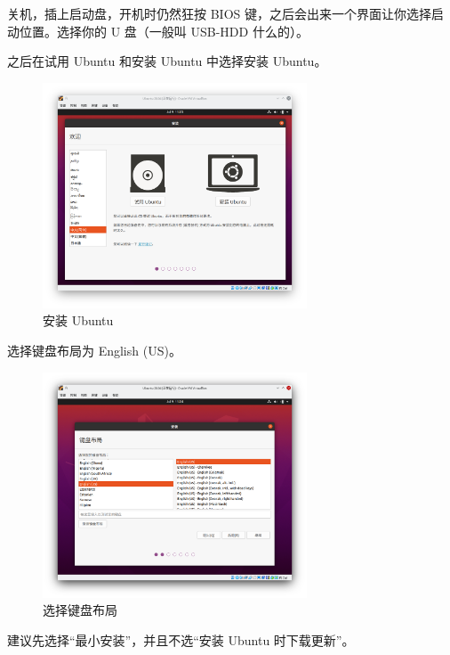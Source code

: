 \documentclass[UTF-8]{ctexart}
\begin{document}
				关机，插上启动盘，开机时仍然狂按 BIOS 键，之后会出来一个界面让你选择启动位置。选择你的 U 盘（一般叫 USB-HDD 什么的）。
				
				之后在试用 Ubuntu 和安装 Ubuntu 中选择安装 Ubuntu。
				
				\begin{figure}[H]
					\centering
					\includegraphics[width=0.7\textwidth]{fig/ubuntu_install_1.png}
					\caption*{安装 Ubuntu}
				\end{figure}
			
				选择键盘布局为 English (US)。
			
				\begin{figure}[H]
					\centering
					\includegraphics[width=0.7\textwidth]{fig/ubuntu_install_2.png}
					\caption*{选择键盘布局}
				\end{figure}
			
				建议先选择“最小安装”，并且不选“安装 Ubuntu 时下载更新”。
			
\end{document}
